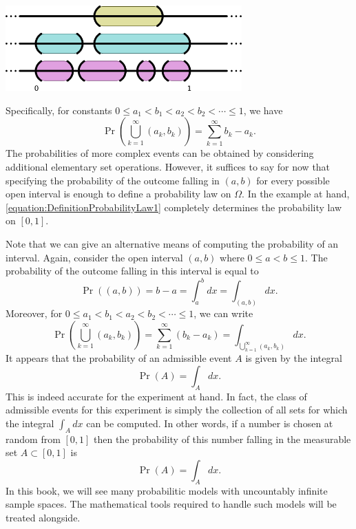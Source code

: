 \begin{center}
\includegraphics[height=3.285cm]{Figures/2Chapter/lineintervals}
\end{center}

Specifically, for constants $0 \leq a_1 < b_1 < a_2 < b_2 < \cdots \leq 1$, we have
\begin{equation*}
\Pr \left( \bigcup_{k=1}^{\infty} (a_k,b_k) \right)
= \sum_{k=1}^{\infty} b_k - a_k .
\end{equation*}
The probabilities of more complex events can be obtained by considering additional elementary set operations.
However, it suffices to say for now that specifying the probability of the outcome falling in $(a,b)$ for every possible open interval is enough to define a probability law on $\Omega$.
In the example at hand, \eqref{equation:DefinitionProbabilityLaw1} completely determines the probability law on $[0,1]$.

Note that we can give an alternative means of computing the probability of an interval.
Again, consider the open interval $(a, b)$ where $0 \leq a < b \leq 1$.
The probability of the outcome falling in this  interval is equal to
\begin{equation*}
\Pr ( (a, b) ) = b - a = \int_a^b dx = \int_{(a,b)} dx .
\end{equation*}
Moreover, for $0 \leq a_1 < b_1 < a_2 < b_2 < \cdots \leq 1$, we can write
\begin{equation*}
\Pr \left( \bigcup_{k=1}^{\infty} (a_k,b_k) \right)
= \sum_{k=1}^{\infty} \left( b_k - a_k \right)
= \int_{\bigcup_{k=1}^{\infty} (a_k,b_k)} dx .
\end{equation*}
It appears that the probability of an admissible event $A$ is given by the integral
\begin{equation*}
\Pr (A) = \int_{A} dx .
\end{equation*}
This is indeed accurate for the experiment at hand.
In fact, the class of admissible events for this experiment is simply the collection of all sets for which the integral $\int_A dx$ can be computed.
In other words, if a number is chosen at random from $[0,1]$ then the probability of this number falling in the measurable set $A \subset [0,1]$ is
\begin{equation*}
\Pr (A) = \int_{A} dx .
\end{equation*}
In this book, we will see many probabilitic models with uncountably infinite sample spaces.
The mathematical tools required to handle such models will be treated alongside.


